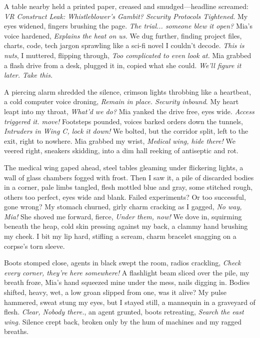 \documentclass[12pt,oneside]{book}
\begin{document}
A table nearby held a printed paper, creased and smudged—headline screamed: \textit{VR Construct Leak: Whistleblower’s Gambit? Security Protocols Tightened.} My eyes widened, fingers brushing the page. \textit{The trial... someone blew it open?} Mia’s voice hardened, \textit{Explains the heat on us.} We dug further, finding project files, charts, code, tech jargon sprawling like a sci-fi novel I couldn’t decode. \textit{This is nuts}, I muttered, flipping through, \textit{Too complicated to even look at.} Mia grabbed a flash drive from a desk, plugged it in, copied what she could. \textit{We’ll figure it later. Take this.}

A piercing alarm shredded the silence, crimson lights throbbing like a heartbeat, a cold computer voice droning, \textit{Remain in place. Security inbound}. My heart leapt into my throat, \textit{What’d we do?} Mia yanked the drive free, eyes wide. \textit{Access triggered it. move!} Footsteps pounded, voices barked orders down the tunnels, \textit{Intruders in Wing C, lock it down!} We bolted, but the corridor split, left to the exit, right to nowhere. Mia grabbed my wrist, \textit{Medical wing, hide there!} We veered right, sneakers skidding, into a dim hall reeking of antiseptic and rot.

The medical wing gaped ahead, steel tables gleaming under flickering lights, a wall of glass chambers fogged with frost. Then I saw it, a pile of discarded bodies in a corner, pale limbs tangled, flesh mottled blue and gray, some stitched rough, others too perfect, eyes wide and blank. Failed experiments? Or too successful, gone wrong? My stomach churned, girly charm cracking as I gagged, \textit{No way, Mia!} She shoved me forward, fierce, \textit{Under them, now!} We dove in, squirming beneath the heap, cold skin pressing against my back, a clammy hand brushing my cheek. I bit my lip hard, stifling a scream, charm bracelet snagging on a corpse’s torn sleeve.

Boots stomped close, agents in black swept the room, radios crackling, \textit{Check every corner, they’re here somewhere!} A flashlight beam sliced over the pile, my breath froze, Mia’s hand squeezed mine under the mess, nails digging in. Bodies shifted, heavy, wet, a low groan slipped from one, was it alive? My pulse hammered, sweat stung my eyes, but I stayed still, a mannequin in a graveyard of flesh. \textit{Clear, Nobody there.}, an agent grunted, boots retreating, \textit{Search the east wing.} Silence crept back, broken only by the hum of machines and my ragged breaths.
\end{document}
